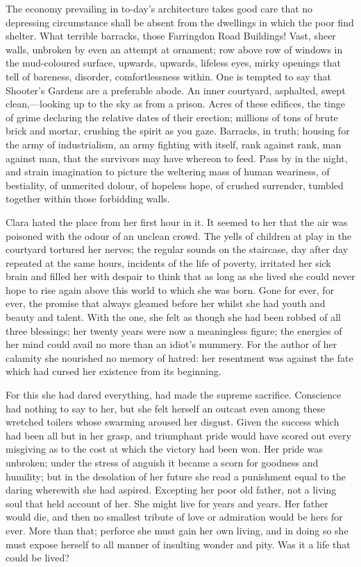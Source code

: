 The economy prevailing in to-day's architecture takes good care that no
depressing circumstance shall be absent from the dwellings in which the
poor find shelter. What terrible barracks, those Farringdon Road
Buildings! Vast, sheer walls, unbroken by even an attempt at ornament;
row above row of windows in the mud-coloured surface, upwards, upwards,
lifeless eyes, mirky openings that tell of bareness, disorder,
comfortlessness within. One is tempted to say that Shooter's Gardens are
a preferable abode. An inner courtyard, asphalted, swept
clean,---looking up to the sky as from a prison. Acres of these
edifices, the tinge of grime declaring the relative dates of their
erection; millions of tons of brute brick and mortar, crushing the
spirit as you gaze. Barracks, in truth; housing for the army of
industrialism, an army fighting with itself, rank against rank, man
against man, that the survivors may have {}whereon to feed. Pass by in
the night, and strain imagination to picture the weltering mass of human
weariness, of bestiality, of unmerited dolour, of hopeless hope, of
crushed surrender, tumbled together within those forbidding walls.

Clara hated the place from her first hour in it. It seemed to her that
the air was poisoned with the odour of an unclean crowd. The yells of
children at play in the courtyard tortured her nerves; the regular
sounds on the staircase, day after day repeated at the same hours,
incidents of the life of poverty, irritated her sick brain and filled
her with despair to think that as long as she lived she could never hope
to rise again above this world to which she was born. Gone for ever, for
ever, the promise that always gleamed before her whilst she had youth
and beauty and talent. With the one, she felt as though she had been
robbed of all three blessings; her twenty years were now a meaningless
figure; the energies of her mind could avail no more than an idiot's
mummery. For the author of her calamity she nourished no memory of
hatred: her resentment was {}against the fate which had cursed her
existence from its beginning.

For this she had dared everything, had made the supreme sacrifice.
Conscience had nothing to say to her, but she felt herself an outcast
even among these wretched toilers whose swarming aroused her disgust.
Given the success which had been all but in her grasp, and triumphant
pride would have scored out every misgiving as to the cost at which the
victory had been won. Her pride was unbroken; under the stress of
anguish it became a scorn for goodness and humility; but in the
desolation of her future she read a punishment equal to the daring
wherewith she had aspired. Excepting her poor old father, not a living
soul that held account of her. She might live for years and years. Her
father would die, and then no smallest tribute of love or admiration
would be hers for ever. More than that; perforce she must gain her own
living, and in doing so she must expose herself to all manner of
insulting wonder and pity. Was it a life that could be lived?

